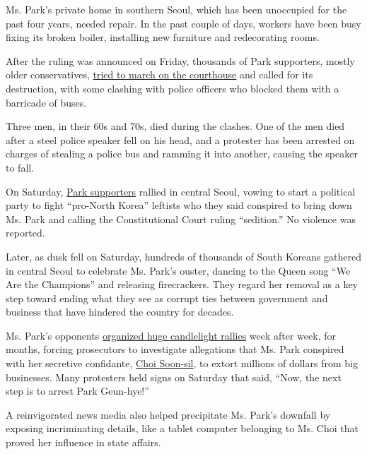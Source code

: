 Ms. Park's private home in southern Seoul, which has been unoccupied for
the past four years, needed repair. In the past couple of days, workers
have been busy fixing its broken boiler, installing new furniture and
redecorating rooms.

After the ruling was announced on Friday, thousands of Park supporters,
mostly older conservatives,
\href{https://www.nytimes3xbfgragh.onion/2017/03/10/world/asia/south-korea-president-impeached-protests.html}{tried
to march on the courthouse} and called for its destruction, with some
clashing with police officers who blocked them with a barricade of
buses.

Three men, in their 60s and 70s, died during the clashes. One of the men
died after a steel police speaker fell on his head, and a protester has
been arrested on charges of stealing a police bus and ramming it into
another, causing the speaker to fall.

On Saturday,
\href{https://www.nytimes3xbfgragh.onion/2017/02/18/world/asia/south-korea-impeached-leader-park-geun-hye.html}{Park
supporters} rallied in central Seoul, vowing to start a political party
to fight ``pro-North Korea'' leftists who they said conspired to bring
down Ms. Park and calling the Constitutional Court ruling ``sedition.''
No violence was reported.

Later, as dusk fell on Saturday, hundreds of thousands of South Koreans
gathered in central Seoul to celebrate Ms. Park's ouster, dancing to the
Queen song ``We Are the Champions'' and releasing firecrackers. They
regard her removal as a key step toward ending what they see as corrupt
ties between government and business that have hindered the country for
decades.

Ms. Park's opponents
\href{https://www.nytimes3xbfgragh.onion/2016/11/26/world/asia/korea-park-geun-hye-protests.html}{organized
huge candlelight rallies} week after week, for months, forcing
prosecutors to investigate allegations that Ms. Park conspired with her
secretive confidante,
\href{https://www.nytimes3xbfgragh.onion/2016/11/01/world/asia/south-korea-park-geun-hye-choi-soon-sil.html}{Choi
Soon-sil}, to extort millions of dollars from big businesses. Many
protesters held signs on Saturday that said, ``Now, the next step is to
arrest Park Geun-hye!''

A reinvigorated news media also helped precipitate Ms. Park's downfall
by exposing incriminating details, like a tablet computer belonging to
Ms. Choi that proved her influence in state affairs.

